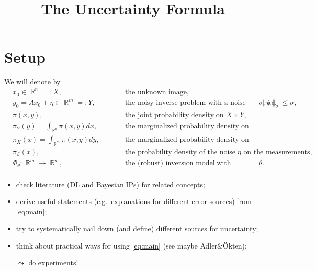 \documentclass{article}
\title{The Uncertainty Formula}
\date{}
\author{}
\DeclareMathOperator{\R}{\mathbb{R}}
\begin{document}
\maketitle
% 

\section*{Setup}

We will denote by
\begin{align*}
&x_0\in\R^n = :X, \qquad &&\text{the unknown image,}\\
&y_0 = Ax_0+ \eta \in \R^m =:Y, \qquad &&\text{the noisy inverse problem with a noise magnitude of $\sigma$, i.e.} \|\eta\|_2\leq\sigma,\\
&\pi (x,y), \qquad &&\text{the joint probability density on $X\times Y$,}\\
&\pi_Y (y) = \int_{\R^n} \pi (x,y) dx, \qquad &&\text{the marginalized probability density on the measurement space,}\\
&\pi_X(x) = \int_{\R^m} \pi (x,y) dy, \qquad &&\text{the marginalized probability density on the image space,}\\
&\pi_\mathcal{E}(x), \qquad &&\text{the probability density of the noise $\eta$ on the measurements,}\\
&\Phi_\theta : \R^m \to \R^n, \qquad &&\text{the (robust) inversion model with parameters $\theta$.}\\
\end{align*}

\begin{tcolorbox}[title=ToDo]
\begin{itemize}
 \item check literature (DL and Bayesian IPs) for related concepts; 
 \item derive useful statements (e.g.~explanations for different error sources) from \eqref{eq:main};
 \item try to systematically nail down (and define) different sources for uncertainty;
 \item think about practical ways for using \eqref{eq:main} (see maybe Adler\&Ökten);
 
 $\leadsto$ do experiments!
\end{itemize}
\end{tcolorbox}
% 
\end{document}
